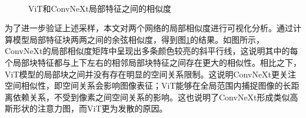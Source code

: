 \begin{figure}[H]
    \centering
    \\
     \caption{ViT和ConvNeXt局部特征之间的相似度}
    \label{fig:patch-smi}
\end{figure}

为了进一步验证上述采样，本文对两个网络的局部相似度进行可视化分析。通过计算模型局部特征块两两之间的余弦相似度，得到图\ref{fig:patch-smi}的结果。如图所示，ConvNeXt的局部相似度矩阵中呈现出多条颜色较亮的斜平行线，这说明其中的每个局部块特征都与上下左右的相邻局部块特征之间存在更大的相似性。相比之下，ViT模型的局部块之间并没有存在明显的空间关系限制。这说明ConvNeXt更关注空间相似性，即空间关系会影响图像表征；ViT能够在全局范围内捕捉图像的长距离依赖关系，不受到像素之间空间关系的影响。这也说明了ConvNeXt形成类似高斯形状的注意力图，而ViT更为发散的原因。

